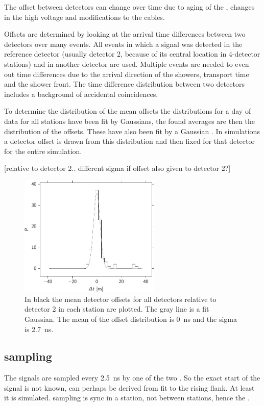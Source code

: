 The offset between detectors can change over time due to aging of the
\pmt, changes in the high voltage and modifications to the cables.

Offsets are determined by looking at the arrival time differences
between two detectors over many events. All events in which a signal was
detected in the reference detector (usually detector 2, because of its
central location in 4-detector stations) and in another detector are
used. Multiple events are needed to even out time differences due to the
arrival direction of the showers, transport time and the shower front.
The time difference distribution between two detectors includes a
background of accidental coincidences.

To determine the distribution of the mean offsets the distributions for
a day of data for all stations have been fit by Gaussians, the found
averages are then the distribution of the offsets. These have also been
fit by a Gaussian . In
simulations a detector offset is drawn from this distribution and then
fixed for that detector for the entire simulation.

[relative to detector 2.. different sigma if offset also given to detector 2?]

\begin{figure}
    \centering
    \includegraphics[width=0.6\textwidth]{plots/response/detector_offset_distribution_20140101_d2.pdf}
    \caption{ In black the mean
             detector offsets for all detectors relative to detector 2
             in each station are plotted. The gray line is a fit
             Gaussian. The mean of the offset distribution is
             \SI{0}{\nano\second} and the sigma is
             \SI{2.7}{\nano\second}.}
    \label{fig:detector_offset_distribution}
\end{figure}


\subsection{\adc sampling}

The \pmt signals are sampled every \SI{2.5}{\nano\second} by one of the
two \adcs. So the exact start of the signal is not known, can perhaps be
derived from fit to the rising flank. At least it is simulated. sampling
is sync in a station, not between stations, hence the \gps.
